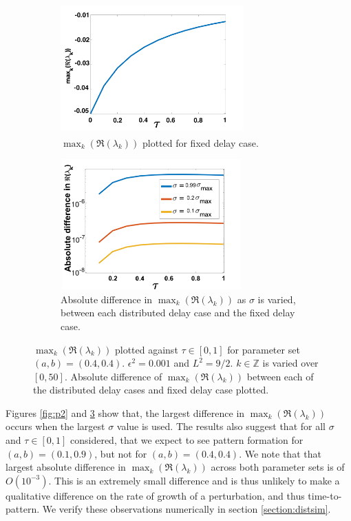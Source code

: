 \begin{figure}[H]
    \centering
    \begin{subfigure}[t]{0.45\textwidth}
        \centering
        \includegraphics[width=7cm,height=5cm]{p3fixed.png}
        \caption{$\max_k(\Re(\lambda_k))$ plotted for fixed delay case.}
        \label{}
    \end{subfigure}
    \hfill
    \begin{subfigure}[t]{0.45\textwidth}
        \centering
        \includegraphics[width=7cm,height=5cm]{dispdiff2.png}
        \caption{Absolute difference in $\max_k(\Re(\lambda_k))$ as $\sigma$ is varied, between each distributed delay case and the fixed delay case.}
        \label{}
    \end{subfigure}
    \caption{$\max_k(\Re(\lambda_k))$ plotted against $\tau\in[0,1]$ for parameter set $(a,b)=(0.4,0.4)$. $\epsilon^2=0.001$ and $L^2=9/2$. $k\in\mathbb{Z}$ is varied over $[0,50]$. Absolute difference of $\max_k(\Re(\lambda_k))$ between each of the distributed delay cases and fixed delay case plotted.}
    \label{fig:p3}
\end{figure}

Figures \ref{fig:p2} and \ref{fig:p3} show that, the largest difference in $\max_k(\Re(\lambda_k))$ occurs when the largest $\sigma$ value is used. The results also suggest that for all $\sigma$ and $\tau\in[0,1]$ considered, that we expect to see pattern formation for $(a,b)=(0.1,0.9)$, but not for $(a,b)=(0.4,0.4)$. We note that that largest absolute difference in $\max_k(\Re(\lambda_k))$ across both parameter sets is of $O(10^{-3})$. This is an extremely small difference and is thus unlikely to make a qualitative difference on the rate of growth of a perturbation, and thus time-to-pattern. We verify these observations numerically in section \ref{section:distsim}.

